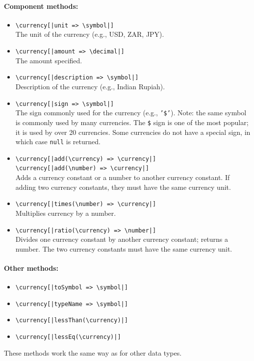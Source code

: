 \documentclass[11pt]{article}
\newcommand{\bs}{\textbackslash}
\begin{document}
\paragraph{Component methods:}
\begin{itemize}
\item {\tt \bs{}currency[|unit => \bs{}symbol|]}  
  \\
  The unit of the currency (e.g., USD, ZAR, JPY).
\item {\tt \bs{}currency[|amount => \bs{}decimal|]}  
  \\
  The amount specified.
\item {\tt \bs{}currency[|description => \bs{}symbol|]}  
  \\
  Description of the currency (e.g., Indian Rupiah).
\item {\tt \bs{}currency[|sign => \bs{}symbol|]}  
  \\
  The sign commonly used for the currency (e.g., \texttt{'\$'}).
  Note: the same symbol is commonly used by many currencies. The
  \texttt{\$} sign is one of the most popular; it is used by over 20
  currencies. Some currencies do not have a special sign, in which 
  case \texttt{null} is returned. 
\item \texttt{\bs{}currency[|add(\bs{}currency) => \bs{}currency|]}  \\
  \texttt{\bs{}currency[|add(\bs{}number) => \bs{}currency|]}\\
  Adds a currency constant or a number to another currency constant.
  If adding two currency constants, they must have the same currency unit.
\item \texttt{\bs{}currency[|times(\bs{}number) => \bs{}currency|]}\\
  Multiplies currency by a number.
\item \texttt{\bs{}currency[|ratio(\bs{}currency) => \bs{}number|]}\\
  Divides one currency constant by another currency constant; returns a number.
  The two currency constants must have the same currency unit.
\end{itemize}

\paragraph{Other methods:}
\begin{itemize}
\item {\tt \bs{}currency[|toSymbol => \bs{}symbol|]}  
\item {\tt \bs{}currency[|typeName => \bs{}symbol|]}
\item \texttt{\bs{}currency[|lessThan(\bs{}currency)|]}  
\item \texttt{\bs{}currency[|lessEq(\bs{}currency)|]}  
\end{itemize}
These methods work the same way as for other data types.
\end{document}
